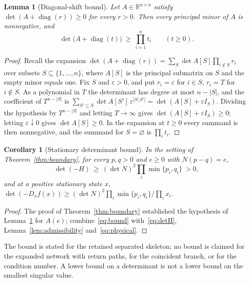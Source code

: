 \documentclass[11pt,a4paper]{article}
\theoremstyle{plain}
\newtheorem{lemma}[theorem]{Lemma}
\newtheorem{corollary}[theorem]{Corollary}
\theoremstyle{definition}
\theoremstyle{remark}
\numberwithin{equation}{section}
\newcommand{\R}{\mathbb{R}}
\newcommand{\diag}{\operatorname{diag}}
\begin{document}
\begin{lemma}[Diagonal-shift bound]\label{lem:bound}
Let $A\in\R^{n\times n}$ satisfy $\det(A+\diag(r))\ge0$ for every $r>0$. Then every principal minor of $A$ is nonnegative, and
\begin{equation}\label{eq:bound}
\det\bigl(A+\diag(t)\bigr)\ \ge\ \prod_{i=1}^nt_i\qquad(t\ge0).
\end{equation}
\end{lemma}

\begin{proof}
Recall the expansion $\det(A+\diag(r))=\sum_{S}\det A[S]\prod_{i\notin S}r_i$ over subsets $S\subseteq\{1,\dots,n\}$, where $A[S]$ is the principal submatrix on $S$ and the empty minor equals one. Fix $S$ and $\varepsilon>0$, and put $r_i=\varepsilon$ for $i\in S$, $r_i=T$ for $i\notin S$. As a polynomial in $T$ the determinant has degree at most $n-|S|$, and the coefficient of $T^{n-|S|}$ is $\sum_{S'\subseteq S}\det A[S']\,\varepsilon^{|S\setminus S'|}=\det(A[S]+\varepsilon I_S)$. Dividing the hypothesis by $T^{n-|S|}$ and letting $T\to\infty$ gives $\det(A[S]+\varepsilon I_S)\ge0$; letting $\varepsilon\downarrow0$ gives $\det A[S]\ge0$. In the expansion at $t\ge0$ every summand is then nonnegative, and the summand for $S=\varnothing$ is $\prod_it_i$.
\end{proof}

\begin{corollary}[Stationary determinant bound]\label{cor:bound}
In the setting of Theorem~\ref{thm:boundary}, for every $p,q>0$ and $e\ge0$ with $N(p-q)=e$,
\begin{equation}\label{eq:chemical}
\det(-H)\ \ge\ (\det N)^2\prod_i\min\{p_i,q_i\}\ >0,
\end{equation}
and at a positive stationary state $x$, $\det(-D_xf(x))\ge(\det N)^2\prod_i\min\{p_i,q_i\}/\prod_ix_i$.
\end{corollary}

\begin{proof}
The proof of Theorem~\ref{thm:boundary} established the hypothesis of Lemma~\ref{lem:bound} for $A(e)$; combine~\eqref{eq:bound} with~\eqref{eq:detH}, Lemma~\ref{lem:admissibility} and~\eqref{eq:physical}.
\end{proof}

The bound is stated for the retained separated skeleton; no bound is claimed for the expanded network with return paths, for the coincident branch, or for the condition number. A lower bound on a determinant is not a lower bound on the smallest singular value.
\end{document}
